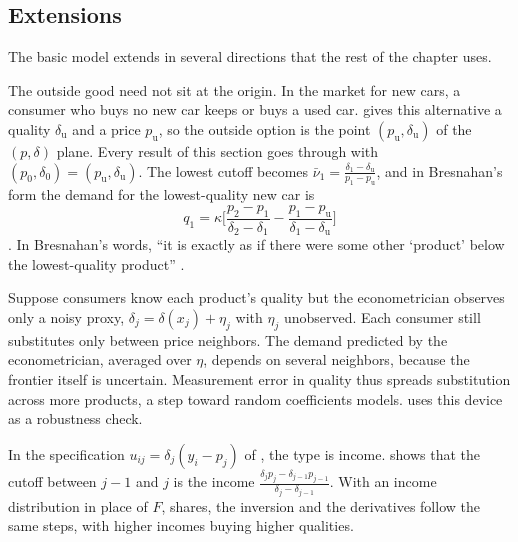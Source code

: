 \subsection{Extensions}\label{sec:06-vext}

The basic model extends in several directions that the rest of the chapter uses.

\begin{remark}\label{rem:06-vext-used}
The outside good need not sit at the origin. In the market for new cars, a consumer who buys no new car
keeps or buys a used car. \citet[eq.~2]{Bresnahan1987} gives this alternative a quality $\delta_{\mathrm u}$
and a price $p_{\mathrm u}$, so the outside option is the point $(p_{\mathrm u}, \delta_{\mathrm u})$ of the
$(p,\delta)$ plane. Every result of this section goes through with $(p_0, \delta_0) = (p_{\mathrm u},
\delta_{\mathrm u})$. The lowest cutoff becomes $\bar\nu_1 = \frac{\delta_1 - \delta_{\mathrm u}}{p_1 - p_{\mathrm u}}$,
and in Bresnahan's form the demand for the lowest-quality new car is
\begin{equation*}
  q_1 = \kappa\Big[\frac{p_2 - p_1}{\delta_2 - \delta_1} - \frac{p_1 - p_{\mathrm u}}{\delta_1 - \delta_{\mathrm u}}\Big]
\end{equation*}
\citep[eq.~9]{Bresnahan1987}. In Bresnahan's words, ``it is exactly as if there were some other `product'
below the lowest-quality product'' \citep[p.~463]{Bresnahan1987}.
\end{remark}

\begin{remark}\label{rem:06-vext-error}
Suppose consumers know each product's quality but the econometrician observes only a noisy proxy,
$\delta_j = \delta(x_j) + \eta_j$ with $\eta_j$ unobserved. Each consumer still substitutes only between price
neighbors. The demand predicted by the econometrician, averaged over $\eta$, depends on several neighbors,
because the frontier itself is uncertain. Measurement error in quality thus spreads substitution across
more products, a step toward random coefficients models.  uses this device as a
robustness check.
\end{remark}

\begin{remark}\label{rem:06-vext-income}
In the specification $u_{ij} = \delta_j(y_i - p_j)$ of \citet{GabszewiczThisse1979}, the type is income.
 shows that the cutoff between $j - 1$ and $j$ is the income
$\frac{\delta_j p_j - \delta_{j-1}p_{j-1}}{\delta_j - \delta_{j-1}}$. With an income distribution in place of
$F$, shares, the inversion and the derivatives follow the same steps, with higher incomes buying higher
qualities.
\end{remark}

